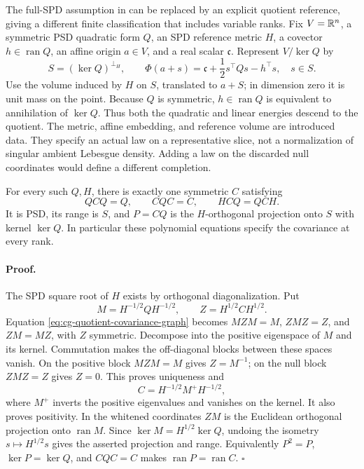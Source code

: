 The full-SPD assumption in
 can be replaced
by an explicit quotient reference, giving a different finite
classification that includes variable ranks. Fix \(V=\mathbb R^n\),
a symmetric PSD quadratic form \(Q\), an SPD reference metric
\(H\), a covector \(h\in\operatorname{ran}Q\), an affine origin
\(a\in V\), and a real scalar \(\mathfrak c\). Represent
\(V/\ker Q\) by
\begin{equation}
S=(\ker Q)^{\perp_H},\qquad
\Phi(a+s)=\mathfrak c+\frac12s^\top Qs-h^\top s,\quad s\in S.
\label{eq:cg-quotient-reference-action}
\end{equation}
Use the volume induced by \(H\) on \(S\), translated to
\(a+S\); in dimension zero it is unit mass on the point.
Because \(Q\) is symmetric, \(h\in\operatorname{ran}Q\) is
equivalent to annihilation of \(\ker Q\). Thus both the
quadratic and linear energies descend to the quotient.
The metric, affine embedding, and reference volume are
introduced data. They specify an actual law on a
representative slice, not a normalization of singular
ambient Lebesgue density. Adding a law on the discarded
null coordinates would define a different completion.

For every such \(Q,H\), there is exactly one symmetric \(C\)
satisfying
\begin{equation}
QCQ=Q,\qquad CQC=C,\qquad HCQ=QCH.
\label{eq:cg-quotient-covariance-graph}
\end{equation}
It is PSD, its range is \(S\), and \(P=CQ\) is the
\(H\)-orthogonal projection onto \(S\) with kernel
\(\ker Q\). In particular these polynomial equations
specify the covariance at every rank.

\paragraph{Proof.}
The SPD square root of \(H\) exists by orthogonal
diagonalization. Put
\begin{equation}
M=H^{-1/2}QH^{-1/2},\qquad
Z=H^{1/2}CH^{1/2}.
\label{eq:cg-quotient-whitened-graph}
\end{equation}
Equation \eqref{eq:cg-quotient-covariance-graph} becomes
\(MZM=M\), \(ZMZ=Z\), and \(ZM=MZ\), with \(Z\) symmetric.
Decompose into the positive eigenspace of \(M\) and its
kernel. Commutation makes the off-diagonal blocks between
these spaces vanish. On the positive block \(MZM=M\)
gives \(Z=M^{-1}\); on the null block \(ZMZ=Z\) gives
\(Z=0\). This proves uniqueness and
\begin{equation}
C=H^{-1/2}M^+H^{-1/2},
\label{eq:cg-quotient-metric-inverse}
\end{equation}
where \(M^+\) inverts the positive eigenvalues and vanishes
on the kernel. It also proves positivity. In the whitened
coordinates \(ZM\) is the Euclidean orthogonal projection
onto \(\operatorname{ran}M\). Since
\(\ker M=H^{1/2}\ker Q\), undoing the isometry
\(s\mapsto H^{1/2}s\) gives the asserted projection and
range. Equivalently \(P^2=P\), \(\ker P=\ker Q\), and
\(CQC=C\) makes \(\operatorname{ran}P=\operatorname{ran}C\).
\(\square\)

